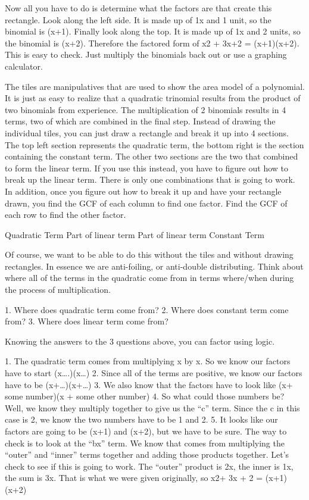 Now all you have to do is determine what the factors are that create this rectangle. Look along the left side. It is made up of 1x and 1 unit, so the binomial is (x+1). Finally look along the top. It is made up of 1x and 2 units, so the binomial is (x+2). Therefore the factored form of x2 + 3x+2 = (x+1)(x+2). This is easy to check. Just multiply the binomials back out or use a graphing calculator.

The tiles are manipulatives that are used to show the area model of a polynomial. It is just as easy to realize that a quadratic trinomial results from the product of two binomials from experience. The multiplication of 2 binomials results in 4 terms, two of which are combined in the final step. Instead of drawing the individual tiles, you can just draw a rectangle and break it up into 4 sections. The top left section represents the quadratic term, the bottom right is the section containing the constant term. The other two sections are the two that combined to form the linear term. If you use this instead, you have to figure out how to break up the linear term. There is only one combinations that is going to work. In addition, once you figure out how to break it up and have your rectangle drawn, you find the GCF of each column to find one factor. Find the GCF of each row to find the other factor.

Quadratic Term
Part of linear term
Part of linear term
Constant Term

Of course, we want to be able to do this without the tiles and without drawing rectangles. In essence we are anti-foiling, or anti-double distributing. Think about where all of the terms in the quadratic come from in terms where/when during the process of multiplication.

1. Where does quadratic term come from?
2. Where does constant term come from?
3. Where does linear term come from?

Knowing the answers to the 3 questions above, you can factor using logic.

1. The quadratic term comes from multiplying x by x. So we know our factors have to start (x\ldots{}.)(x\ldots{})
2. Since all of the terms are positive, we know our factors have to be (x+\ldots{})(x+\ldots{})
3. We also know that the factors have to look like (x+ some number)(x + some other number)
4. So what could those numbers be? Well, we know they multiply together to give us the ``c'' term. Since the c in this case is 2, we know the two numbers have to be 1 and 2.
5. It looks like our factors are going to be (x+1) and (x+2), but we have to be sure. The way to check is to look at the ``bx'' term. We know that comes from multiplying the ``outer'' and ``inner'' terms together and adding those products together. Let's check to see if this is going to work. The ``outer'' product is 2x, the inner is 1x, the sum is 3x. That is what we were given originally, so x2+ 3x + 2 = (x+1)(x+2)


